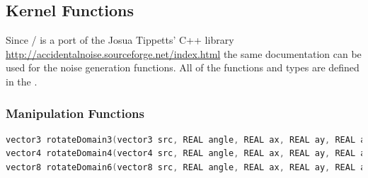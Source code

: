 %
%
%
%

\subsection{Kernel Functions}

Since \ANLOpenCL/ is a port of the Josua Tippetts' C++ library
\url{http://accidentalnoise.sourceforge.net/index.html} the same documentation
can be used for the noise generation functions.
All of the functions and types are defined in the .

\subsubsection{Manipulation Functions}

\begin{lstlisting}[caption={Definition of rotate domain functions},label={lst:rotate_domain_definition},language=OpenCL]
vector3 rotateDomain3(vector3 src, REAL angle, REAL ax, REAL ay, REAL az);
vector4 rotateDomain4(vector4 src, REAL angle, REAL ax, REAL ay, REAL az);
vector8 rotateDomain6(vector8 src, REAL angle, REAL ax, REAL ay, REAL az);
\end{lstlisting}

